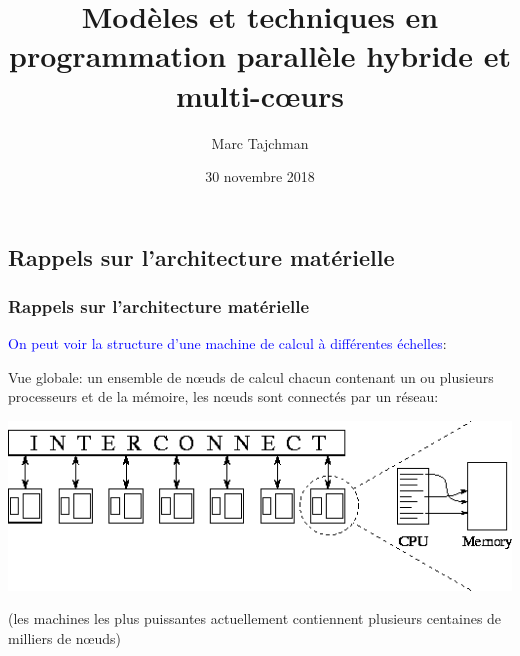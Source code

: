 \documentclass{beamer}
\title{Modèles et techniques en programmation parallèle hybride et multi-c\oe urs}
\author{Marc Tajchman}\institute{CEA - DEN/DM2S/STMF/LMES}
\date{30 novembre 2018}
\begin{document}
\begin{frame}
\titlepage
\end{frame}

\Large
\begin{frame}
  	\tableofcontents
\end{frame}

\begin{frame}
\section{Rappels sur l'architecture mat\'erielle}
\frametitle{Rappels sur l'architecture mat\'erielle}
\textcolor{blue}{On peut voir la structure d'une machine de calcul \`a diff\'erentes \'echelles}:
\vfill

Vue globale: un ensemble de n\oe uds de calcul chacun contenant un ou plusieurs processeurs et de la m\'emoire, les n\oe uds sont connect\'es par un r\'eseau:

\vfill
\begin{center}
\includegraphics[scale=0.4]{../Images/img100}
\end{center}

(les machines les plus puissantes actuellement contiennent plusieurs centaines de milliers de n\oe uds)
\end{frame}
\end{document}
